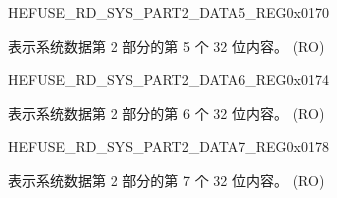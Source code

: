 \begin{register}{H}{EFUSE\_RD\_SYS\_PART2\_DATA5\_REG}{0x0170}\label{regdesc:EFUSERDSYSPART2DATA5REG}
%
\regnewline%
\begin{regdesc}\begin{reglist}
\label{fielddesc:EFUSESYSDATAPART25}\item [EFUSE\_SYS\_DATA\_PART2\_5] 表示系统数据第 2 部分的第 5 个 32 位内容。 (RO)
\end{reglist}\end{regdesc}
\end{register}


\begin{register}{H}{EFUSE\_RD\_SYS\_PART2\_DATA6\_REG}{0x0174}\label{regdesc:EFUSERDSYSPART2DATA6REG}
%
\regnewline%
\begin{regdesc}\begin{reglist}
\label{fielddesc:EFUSESYSDATAPART26}\item [EFUSE\_SYS\_DATA\_PART2\_6] 表示系统数据第 2 部分的第 6 个 32 位内容。 (RO)
\end{reglist}\end{regdesc}
\end{register}


\begin{register}{H}{EFUSE\_RD\_SYS\_PART2\_DATA7\_REG}{0x0178}\label{regdesc:EFUSERDSYSPART2DATA7REG}
%
\regnewline%
\begin{regdesc}\begin{reglist}
\label{fielddesc:EFUSESYSDATAPART27}\item [EFUSE\_SYS\_DATA\_PART2\_7] 表示系统数据第 2 部分的第 7 个 32 位内容。 (RO)
\end{reglist}\end{regdesc}
\end{register}


